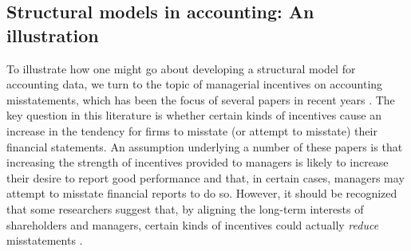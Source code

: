 %
%

\subsection{Structural models in accounting: An illustration}
To illustrate how one might go about developing a structural model for accounting data, we turn to the topic of managerial incentives on accounting misstatements, which has been the focus of several papers in recent years \citep[see][]{Armstrong:2010jd}.
The key question in this literature is whether certain kinds of incentives cause an increase in the tendency for firms to misstate (or attempt to misstate) their financial statements.
An assumption underlying a number of these papers is that increasing the strength of incentives provided to managers is likely to increase their desire to report good performance and that, in certain cases, managers may attempt to misstate financial reports to do so.
However, it should be recognized that some researchers suggest that, by aligning the long-term interests of shareholders and managers, certain kinds of incentives could actually \emph{reduce} misstatements \citep{Burns:2006ce}.

